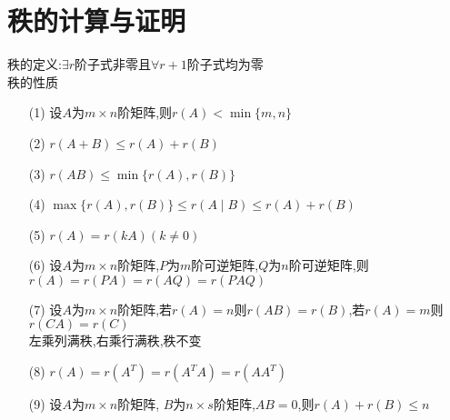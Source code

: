 \documentclass[12pt, a4paper, oneside, UTF8]{ctexbook}
\begin{document}
\section{秩的计算与证明}
\begin{remark}[秩]
    秩的定义:$\exists r$阶子式非零且$\forall r+1$阶子式均为零 \\
    秩的性质
    \begin{enumerate}
    \item[(1)] 设$A$为$m\times n$阶矩阵,则$r(A)<\min\{m,n\}$
    \item[(2)] $r(A+B)\leq r(A)+r(B)$
    \item[(3)] $r(AB)\leq\min\{r(A),r(B)\}$
    \item[(4)] $\max\{r(A),r(B)\}\leq r(A\mid B)\leq r(A) + r(B)$
    \item[(5)] $r(A)=r(kA)(k\neq 0)$
    \item[(6)] 设$A$为$m\times n$阶矩阵,$P$为$m$阶可逆矩阵,$Q$为$n$阶可逆矩阵,则
    $r(A)=r(PA)=r(AQ)=r(PAQ)$
    \item[(7)] 设$A$为$m\times n$阶矩阵,若$r(A)=n$则$r(AB)=r(B)$,若$r(A)=m$则$r(CA)=r(C)$ \\
    左乘列满秩,右乘行满秩,秩不变
    \item[(8)] $r(A)=r(A^T)=r(A^TA)=r(AA^T)$
    \item[(9)] 设$A$为$m\times n$阶矩阵, $B$为$n\times s$阶矩阵,$AB=0$,则$r(A)+r(B)\leq n$
    \end{enumerate}
\end{remark}
\end{document}
